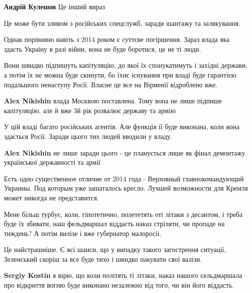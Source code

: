 \begin{itemize}
\begin{itemize}
\textbf{Андрій Кулешов}
Це інший вираз

\end{itemize} %


Це може бути зливом з російських спецслужб, заради шантажу та залякування.

Однак порівняно навіть з 2014 роком є суттєве погіршення. Зараз влада яка
здасть Україну в разі війни, вона не буде боротися, це не ті люди.

Вони швидко підпишуть капітуляцію, до якої їх спонукатимуть і західні держави,
а потім їх не можна буде скинути, бо їхнє існування при владі буде гарантією
подальшого ненаступу Росії. Власне це все на Вірменії відроблено вже.

\begin{itemize} %
\textbf{Alex Nikishin} влада Москвою поставлена. Тому вона не лише підпише капітуляцію, але й вже 3й рік розвалює державу та армію

У цій владі багато російських агентів. Але функція її буде виконана, коли вона здасться Росії. Заради цього тих людей вводили у владу.

\textbf{Alex Nikishin} не лише заради цього - це планується лише як фінал демонтажу української державності та армії
\end{itemize} %


Есть одно существенное отличие от 2014 года - Верховный главнокомандующий
Украины. Под которым уже зашаталось кресло. Лучшей возможности для Кремля может
никогда не представится.



Мене більш турбує, коли, гіпотетично, полететять оті літаки з десантом, і треба
буде їх збивати, наш фельдмаршал віддасть наказ стріляти, чи пропаде на
тиждень? А потім вилізе і вже губернатор малоросіі.

\begin{itemize} %

Це найстрашніше. Є всі шанси, що у випадку такого загострення ситуації,
Зеленський скоріш за все буде тихо і швидко пакувати свої валізи.


\textbf{Sergiy Kostin} я вірю, що коли політять ті літаки, наказ нашого сельдмаршала про відкриття вогню буде виконано незалежно від того, чи він його віддасть.


\end{itemize}
\end{itemize}
